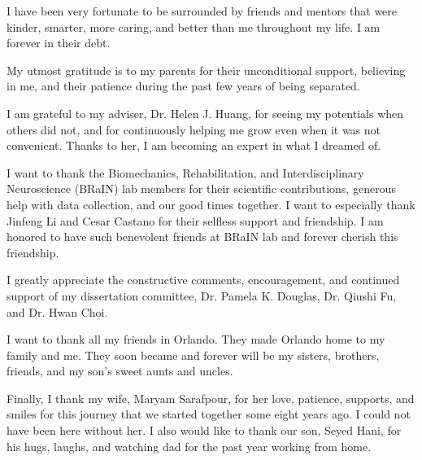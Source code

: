\documentclass{UCF_ETD}
\begin{document}
\begin{acknowledgments}
I have been very fortunate to be surrounded by friends and mentors that were kinder, smarter, more caring, and better than me throughout my life. I am forever in their debt.

My utmost gratitude is to my parents for their unconditional support, believing in me, and their patience during the past few years of being separated.

I am grateful to my adviser, Dr. Helen J. Huang, for seeing my potentials when others did not, and for continuously helping me grow even when it was not convenient. Thanks to her, I am becoming an expert in what I dreamed of.

I want to thank the Biomechanics, Rehabilitation, and Interdisciplinary Neuroscience (BRaIN) lab members for their scientific contributions, generous help with data collection, and our good times together. I want to especially thank Jinfeng Li and Cesar Castano for their selfless support and friendship. I am honored to have such benevolent friends at BRaIN lab and forever cherish this friendship.

I greatly appreciate the constructive comments, encouragement, and continued support of my dissertation committee, Dr. Pamela K. Douglas, Dr. Qiushi Fu, and Dr. Hwan Choi.

I want to thank all my friends in Orlando. They made Orlando home to my family and me. They soon became and forever will be my sisters, brothers, friends, and my son's sweet aunts and uncles.

Finally, I thank my wife, Maryam Sarafpour, for her love, patience, supports, and smiles for this journey that we started together some eight years ago. I could not have been here without her. I also would like to thank our son, Seyed Hani, for his hugs, laughs, and watching dad for the past year working from home.
\end{acknowledgments}

\tableofcontents

\listoffigures

\listoftables

\mainmatter




\end{document}
